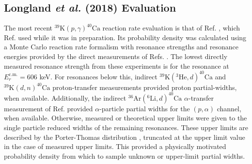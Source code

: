 \subsection{Longland \emph{et al.} (2018) Evaluation} \label{subsec:longland_rate}

The most recent $^{39}\mathrm{K}(p,\gamma)^{40}\mathrm{Ca}$ reaction rate evaluation is that of Ref. \cite{Longland2018}, which Ref. \cite{Dermigny2017} used while it was in preparation. Its probability density was calculated using a Monte Carlo reaction rate formalism \cite{Longland2010a} with resonance strengths and resonance energies provided by the direct measurements of Refs. \cite{Kikstra1990,Cheng1981,Leenhouts1966}. The lowest directly measured resonance strength from these experiments is for the resonance at $E^{\mathrm{c.m.}}_{r} = 606$ keV. For resonances below this, indirect $^{39}\mathrm{K}(^{3}\mathrm{He},d)^{40}\mathrm{Ca}$ \cite{Cage1971} and $^{39}\mathrm{K}(d,n)^{40}\mathrm{Ca}$ \cite{Fuchs1969} proton-transfer measurements provided proton partial-widths, when available. Additionally, the indirect $^{36}\mathrm{Ar}(^{6}\mathrm{Li},d)^{40}\mathrm{Ca}$ $\alpha$-transfer measurement of Ref. \cite{Yamaya1994} provided $\alpha$-particle partial widths for the $(p,\alpha)$ channel, when available. Otherwise, measured or theoretical upper limits were given to the single particle reduced widths of the remaining resonances. These upper limits are described by the Porter-Thomas distribution \cite{Porter1956,Weidenmuller2009}, truncated at the upper limit value in the case of measured upper limits. This provided a physically motivated probability density from which to sample unknown or upper-limit partial widths.

